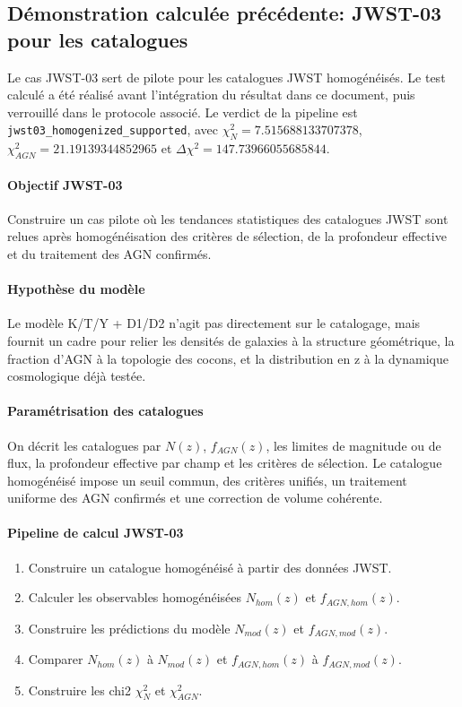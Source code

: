 \documentclass[11pt,a4paper]{article}
\begin{document}
\subsection{Démonstration calculée précédente: JWST-03 pour les catalogues}
Le cas JWST-03 sert de pilote pour les catalogues JWST homogénéisés. Le test calculé a été réalisé avant l'intégration du résultat dans ce document, puis verrouillé dans le protocole associé. Le verdict de la pipeline est \texttt{jwst03\_homogenized\_supported}, avec $\chi^2_N=7.515688133707378$, $\chi^2_{AGN}=21.19139344852965$ et $\Delta\chi^2=147.73966055685844$.

\paragraph{Objectif JWST-03}
Construire un cas pilote où les tendances statistiques des catalogues JWST sont relues après homogénéisation des critères de sélection, de la profondeur effective et du traitement des AGN confirmés.

\paragraph{Hypothèse du modèle}
Le modèle K/T/Y + D1/D2 n'agit pas directement sur le catalogage, mais fournit un cadre pour relier les densités de galaxies à la structure géométrique, la fraction d'AGN à la topologie des cocons, et la distribution en z à la dynamique cosmologique déjà testée.

\paragraph{Paramétrisation des catalogues}
On décrit les catalogues par $N(z)$, $f_{AGN}(z)$, les limites de magnitude ou de flux, la profondeur effective par champ et les critères de sélection. Le catalogue homogénéisé impose un seuil commun, des critères unifiés, un traitement uniforme des AGN confirmés et une correction de volume cohérente.

\paragraph{Pipeline de calcul JWST-03}
\begin{enumerate}[leftmargin=*,itemsep=0.2em,topsep=0.2em]
\item Construire un catalogue homogénéisé à partir des données JWST.
\item Calculer les observables homogénéisées $N_{hom}(z)$ et $f_{AGN,hom}(z)$.
\item Construire les prédictions du modèle $N_{mod}(z)$ et $f_{AGN,mod}(z)$.
\item Comparer $N_{hom}(z)$ à $N_{mod}(z)$ et $f_{AGN,hom}(z)$ à $f_{AGN,mod}(z)$.
\item Construire les chi2 $\chi^2_N$ et $\chi^2_{AGN}$.
\end{enumerate}
\end{document}
